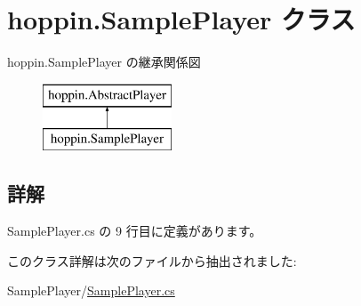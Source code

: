 \hypertarget{classhoppin_1_1_sample_player}{}\section{hoppin.\+Sample\+Player クラス}
\label{classhoppin_1_1_sample_player}
hoppin.\+Sample\+Player の継承関係図\begin{figure}[H]
\begin{center}
\leavevmode
\includegraphics[height=2.000000cm]{d7/dfe/classhoppin_1_1_sample_player}
\end{center}
\end{figure}


\subsection{詳解}


 Sample\+Player.\+cs の 9 行目に定義があります。



このクラス詳解は次のファイルから抽出されました\+:\begin{DoxyCompactItemize}
\item 
Sample\+Player/\hyperlink{_sample_player_8cs}{Sample\+Player.\+cs}\end{DoxyCompactItemize}
